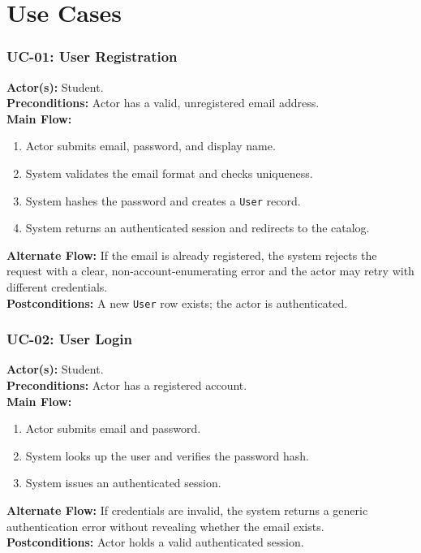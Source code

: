 \documentclass[11pt]{article}
\begin{document}
\section{Use Cases}

\subsubsection*{UC-01: User Registration}
\textbf{Actor(s):} Student.\\
\textbf{Preconditions:} Actor has a valid, unregistered email address.\\
\textbf{Main Flow:}
\begin{enumerate}
\item Actor submits email, password, and display name.
\item System validates the email format and checks uniqueness.
\item System hashes the password and creates a \texttt{User} record.
\item System returns an authenticated session and redirects to the
      catalog.
\end{enumerate}
\textbf{Alternate Flow:} If the email is already registered, the
system rejects the request with a clear, non-account-enumerating
error and the actor may retry with different credentials.\\
\textbf{Postconditions:} A new \texttt{User} row exists; the actor is
authenticated.

\subsubsection*{UC-02: User Login}
\textbf{Actor(s):} Student.\\
\textbf{Preconditions:} Actor has a registered account.\\
\textbf{Main Flow:}
\begin{enumerate}
\item Actor submits email and password.
\item System looks up the user and verifies the password hash.
\item System issues an authenticated session.
\end{enumerate}
\textbf{Alternate Flow:} If credentials are invalid, the system
returns a generic authentication error without revealing whether the
email exists.\\
\textbf{Postconditions:} Actor holds a valid authenticated session.
\end{document}

